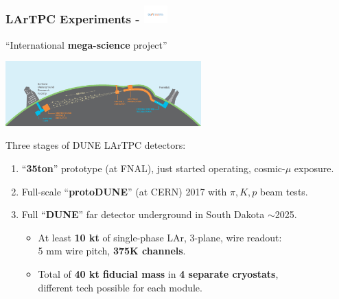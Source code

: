 \begin{frame}[fragile]
  \frametitle{LArTPC Experiments - \includegraphics[height=7mm,trim=4cm 9.2cm 4cm 9.3cm,clip,valign=c]{DUNElogo_colorHORIZONTAL.pdf}}
  \begin{center}
    ``International \textbf{mega-science} project''

    \includegraphics[height=25mm]{LBNF_Graphic_021715-1024x340.png}
  \end{center}


  Three stages of DUNE LArTPC detectors:
  \begin{enumerate}\footnotesize
  \item ``\textbf{35ton}'' prototype (at FNAL), just started operating, cosmic-$\mu$ exposure. 
  \item Full-scale ``\textbf{protoDUNE}'' (at CERN) 2017 with $\pi, K, p$ beam tests.
  \item Full ``\textbf{DUNE}'' far detector underground in South Dakota $\sim$2025.
    \begin{itemize}
    \item At least \textbf{10 kt} of single-phase LAr, 3-plane, wire readout: \\
      5 mm wire pitch, \textbf{375K channels}.

    \item Total of \textbf{40 kt fiducial mass} in \textbf{4 separate cryostats}, \\
      \footnotesize{different tech possible for each module.}

    \end{itemize}
  \end{enumerate}

\end{frame}


